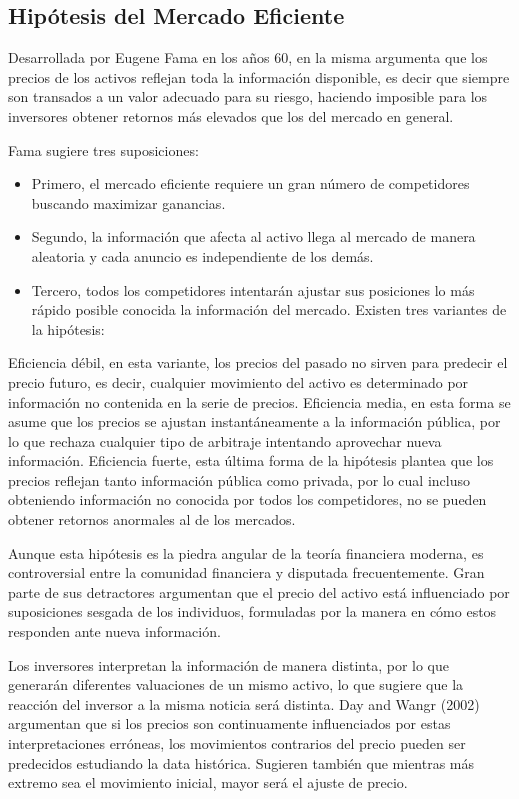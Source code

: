 \documentclass[a4paper,12pt]{Latex/Classes/PhDthesisPSnPDF}
\begin{document}
\subsection{Hipótesis del Mercado Eficiente}

Desarrollada por Eugene Fama en los años 60, en la misma argumenta que los precios de los activos reflejan toda la información disponible, es decir que siempre son transados a un valor adecuado para su riesgo, haciendo imposible para los inversores obtener retornos más elevados que los del mercado en general. 

Fama sugiere tres suposiciones:
\begin{itemize}
\item Primero, el mercado eficiente requiere un gran número de competidores buscando maximizar ganancias. \item Segundo, la información que afecta al activo llega al mercado de manera aleatoria y cada anuncio es independiente de los demás.
\item Tercero, todos los competidores intentarán ajustar sus posiciones lo más rápido posible conocida la información del mercado. Existen tres variantes de la hipótesis:
\end{itemize}

Eficiencia débil, en esta variante, los precios del pasado no sirven para predecir el precio futuro, es decir, cualquier movimiento del activo es determinado por información no contenida en la serie de precios. Eficiencia media, en esta forma se asume que los precios se ajustan instantáneamente a la información pública, por lo que rechaza cualquier tipo de arbitraje intentando aprovechar nueva información. Eficiencia fuerte, esta última forma de la hipótesis plantea que los precios reflejan tanto información pública como privada, por lo cual incluso obteniendo información no conocida por todos los competidores, no se pueden obtener retornos anormales al de los mercados.

Aunque esta hipótesis es la piedra angular de la teoría financiera moderna, es controversial entre la comunidad financiera y disputada frecuentemente. Gran parte de sus detractores argumentan que el precio del activo está influenciado por suposiciones sesgada de los individuos, formuladas por la manera en cómo estos responden ante nueva información.

Los inversores interpretan la información de manera distinta, por lo que generarán diferentes valuaciones de un mismo activo, lo que sugiere que la reacción del inversor a la misma noticia será distinta. Day and Wangr (2002) argumentan que si los precios son continuamente influenciados por estas interpretaciones erróneas, los movimientos contrarios del precio pueden ser predecidos estudiando la data histórica. Sugieren también que mientras más extremo sea el movimiento inicial, mayor será el ajuste de precio.
\end{document}
